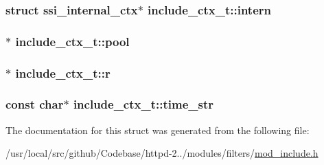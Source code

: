 \subsubsection[{\texorpdfstring{intern}{intern}}]{\setlength{\rightskip}{0pt plus 5cm}struct {\bf ssi\+\_\+internal\+\_\+ctx}$\ast$ include\+\_\+ctx\+\_\+t\+::intern}\hypertarget{structinclude__ctx__t_ad52b688b075100f9955d79dbde939340}{}\label{structinclude__ctx__t_ad52b688b075100f9955d79dbde939340}
\subsubsection[{\texorpdfstring{pool}{pool}}]{$\ast$ include\+\_\+ctx\+\_\+t\+::pool}\hypertarget{structinclude__ctx__t_af20d93a99a0b9fd4b7aaa29eb91d5195}{}\label{structinclude__ctx__t_af20d93a99a0b9fd4b7aaa29eb91d5195}
\subsubsection[{\texorpdfstring{r}{r}}]{$\ast$ include\+\_\+ctx\+\_\+t\+::r}\hypertarget{structinclude__ctx__t_a84929bd794dca8b08725cbc733b3f5ff}{}\label{structinclude__ctx__t_a84929bd794dca8b08725cbc733b3f5ff}
\subsubsection[{\texorpdfstring{time\+\_\+str}{time_str}}]{\setlength{\rightskip}{0pt plus 5cm}const char$\ast$ include\+\_\+ctx\+\_\+t\+::time\+\_\+str}\hypertarget{structinclude__ctx__t_ad96f0ea28c23d20f0e7817a57dc98943}{}\label{structinclude__ctx__t_ad96f0ea28c23d20f0e7817a57dc98943}


The documentation for this struct was generated from the following file\+:\begin{DoxyCompactItemize}
\item 
/usr/local/src/github/\+Codebase/httpd-\/2../modules/filters/\hyperlink{mod__include_8h}{mod\+\_\+include.\+h}\end{DoxyCompactItemize}
